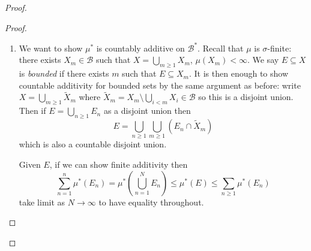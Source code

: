 \documentclass[a4paper]{article}
\begin{document}
\begin{proof}
\begin{proof}
\begin{enumerate}
\begin{proof}
          Now for the actual lemma, let \(E = \bigcap_{n \geq 1} I_n\) where \(I_n \in \mathcal B\). wlog we may assume \(I_{n + 1} \subseteq I_n\). By \(\sigma\)-finiteness assumption, \(X = \bigcup_{m \geq 1} X_m\) where \(X_m \in \mathcal B\) with \(\mu(X_m) < \infty\) so
          \[
            E = \bigcup_{m \geq 1} E \cap X_m.
          \]
          By the claim for all \(m\), \(E \cap X_m \in \mathcal B^*\) so \(E \in \mathcal B^*\).
      \end{proof}
      From the lemma we can derive that \(\mathcal B^*\) is also stable under complementation: given \(E \in \mathcal B^*\), for all \(n\) there exist \(C_n = \bigcup_{i \geq 1} B_{n, i}\) where \(B_{n, i} \in \mathcal B\) such that \(E \subseteq C_n\) and \(\mu^*(C_n \setminus E) \leq \frac{1}{n}\). Now
      \[
        E^c = (\bigcup_{n \geq 1} C_n^c) \cup (E^c \setminus \bigcup_{n \geq 1} C_n^c)
      \]
      but \(C_n^c\) is a countable intersection \(\bigcap_{i \geq 1} B_{n, i}^c\) and \(E^c \setminus \bigcup_{n \geq 1} C_n^c\) is \(\mu^*\)-null so by the lemma, \(C_n^c \in \mathcal B^*\). Therefore their union is also in \(\mathcal B^*\). Since we've shown that null sets are in \(\mathcal B^*\), \(E^c \in \mathcal B^*\).
    \item We want to show \(\mu^*\) is countably additive on \(\mathcal B^*\). Recall that \(\mu\) is \(\sigma\)-finite: there exists \(X_m \in \mathcal B\) such that \(X = \bigcup_{m \geq 1} X_m\), \(\mu(X_m) < \infty\). We say \(E \subseteq X\) is \emph{bounded} if there exists \(m\) such that \(E \subseteq X_m\). It is then enough to show countable additivity for bounded sets by the same argument as before: write \(X = \bigcup_{m \geq 1} \tilde X_m\) where \(\tilde X_m = X_m \setminus \bigcup_{i < m} X_i \in \mathcal B\) so this is a disjoint union. Then if \(E = \bigcup_{n \geq 1} E_n\) as a disjoint union then
      \[
        E = \bigcup_{n \geq 1} \bigcup_{m \geq 1} (E_n \cap \tilde X_m)
      \]
      which is also a countable disjoint union.

      Given \(E\), if we can show finite additivity then
      \[
        \sum_{n = 1}^n \mu^*(E_n)
        = \mu^*(\bigcup_{n = 1}^N E_n)
        \leq \mu^*(E)
        \leq \sum_{n \geq 1} \mu^*(E_n)
      \]
      take limit as \(N \to \infty\) to have equality throughout.




      


\end{enumerate}
\end{proof}
\end{proof}
\end{document}
